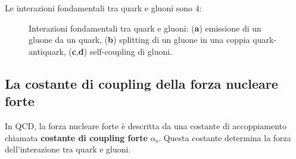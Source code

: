 
Le interazioni fondamentali tra quark e gluoni sono 4:
\begin{figure}[H]
  \centering
  \begin{minipage}
    {1\textwidth}
    \centering
  \end{minipage}
  \begin{minipage}
    {0.225\textwidth}
    \centering
    \captionsetup{labelformat=empty}
    \caption{\textbf{a}}
  \end{minipage}
  \begin{minipage}
    {0.225\textwidth}
    \centering
    \captionsetup{labelformat=empty}
    \caption{\textbf{b}}
  \end{minipage}
  \begin{minipage}
    {0.225\textwidth}
    \centering
    \captionsetup{labelformat=empty}
    \caption{\textbf{c}}
  \end{minipage}
  \begin{minipage}
    {0.225\textwidth}
    \centering
    \captionsetup{labelformat=empty}
    \caption{\textbf{d}}
  \end{minipage}
  \caption{Interazioni fondamentali tra quark e gluoni: (\textbf{a}) emissione di un gluone da un quark, (\textbf{b}) splitting di un gluone in una coppia quark-antiquark, (\textbf{c},\textbf{d}) self-coupling di gluoni.}
\end{figure}

\subsection{La costante di coupling della forza nucleare forte}
In QCD, la forza nucleare forte è descritta da una costante di accoppiamento chiamata \textbf{costante di coupling forte} $\alpha_{\text{s}}$. Questa costante determina la forza dell'interazione tra quark e gluoni.

